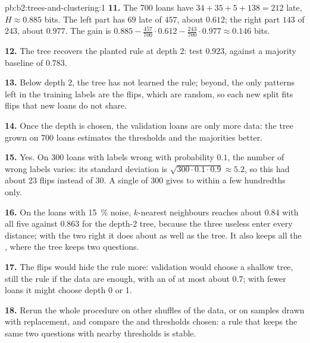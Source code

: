 \begin{solution}{pb:b2:trees-and-clustering:1}
\textbf{11.} The 700 loans have $34 + 35 + 5 + 138 = 212$ late, $H \approx 0.885$ bits. The left part has $69$ late of
$457$,  about $0.612$; the right part $143$ of $243$, about $0.977$. The gain is $0.885 - \tfrac{457}{700} \cdot
0.612 - \tfrac{243}{700} \cdot 0.977 \approx 0.146$ bits.

\textbf{12.} The tree recovers the planted rule at depth 2: test  $0.923$, against a majority baseline of
$0.783$.

\textbf{13.} Below depth 2, the tree has not learned the rule; beyond, the only patterns left in the training labels are
the flips, which are random, so each new split fits flips that new loans do not share.

\textbf{14.} Once the depth is chosen, the validation loans are only more data: the tree grown on 700 loans estimates
the thresholds and the majorities better.

\textbf{15.} Yes. On 300 loans with labels wrong with probability $0.1$, the number of wrong labels varies: its standard
deviation is $\sqrt{300 \cdot 0.1 \cdot 0.9} \approx 5.2$, so this  had about 23 flips instead of 30. A single
 of 300 gives  to within a few hundredths only.

\textbf{16.} On the loans with 15~\% noise, $k$-nearest neighbours reaches about $0.84$ with all five  against
$0.863$ for the depth-2 tree, because the three useless  enter every distance; with the two right  it
does about as well as the tree. It also keeps all the , where the tree keeps two questions.

\textbf{17.} The flips would hide the rule more: validation would choose a shallow tree, still the rule if the data are
enough, with an  of at most about $0.7$; with fewer loans it might choose depth 0 or 1.

\textbf{18.} Rerun the whole procedure on other shuffles of the data, or on samples drawn with replacement, and compare
the  and thresholds chosen: a rule that keeps the same two questions with nearby thresholds is stable.


\end{solution}
